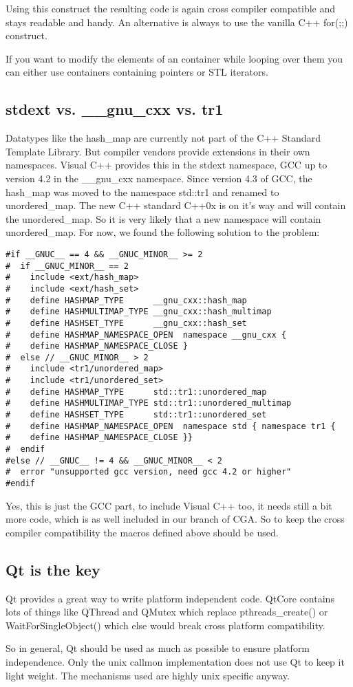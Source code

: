 Using this construct the resulting code is again cross compiler compatible and stays readable and handy. An alternative is always to use the vanilla C++ for(;;) construct. 

If you want to modify the elements of an container while looping over them you can either use containers containing pointers or STL iterators.

\subsection{stdext vs. \_\_gnu\_cxx vs. tr1} Datatypes like the hash\_map are currently not part of the C++ Standard Template Library. But compiler vendors provide extensions in their own namespaces. Visual C++ provides this in the stdext namespace, GCC up to version 4.2 in the \_\_gnu\_cxx namespace. Since version 4.3 of GCC, the hash\_map was moved to the namespace std::tr1 and renamed to unordered\_map. The new C++ standard C++0x is on it's way and will contain the unordered\_map. So it is very likely that a new namespace will contain unordered\_map. For now, we found the following solution to the problem:

\begin{verbatim}
#if __GNUC__ == 4 && __GNUC_MINOR__ >= 2
#  if __GNUC_MINOR__ == 2
#    include <ext/hash_map>
#    include <ext/hash_set>
#    define HASHMAP_TYPE      __gnu_cxx::hash_map
#    define HASHMULTIMAP_TYPE __gnu_cxx::hash_multimap
#    define HASHSET_TYPE      __gnu_cxx::hash_set
#    define HASHMAP_NAMESPACE_OPEN  namespace __gnu_cxx {
#    define HASHMAP_NAMESPACE_CLOSE }
#  else // __GNUC_MINOR__ > 2
#    include <tr1/unordered_map>
#    include <tr1/unordered_set>
#    define HASHMAP_TYPE      std::tr1::unordered_map
#    define HASHMULTIMAP_TYPE std::tr1::unordered_multimap
#    define HASHSET_TYPE      std::tr1::unordered_set
#    define HASHMAP_NAMESPACE_OPEN  namespace std { namespace tr1 {
#    define HASHMAP_NAMESPACE_CLOSE }}
#  endif
#else // __GNUC__ != 4 && __GNUC_MINOR__ < 2
#  error "unsupported gcc version, need gcc 4.2 or higher"
#endif
\end{verbatim}

Yes, this is just the GCC part, to include Visual C++ too, it needs still a bit more code, which is as well included in our branch of CGA. So to keep the cross compiler compatibility the macros defined above should be used. 

\subsection{Qt is the key}

Qt provides a great way to write platform independent code. QtCore contains lots of things like QThread and QMutex which replace pthreads\_create() or WaitForSingleObject() which else would break cross platform compatibility.

So in general, Qt should be used as much as possible to ensure platform independence. Only the unix callmon implementation does not use Qt to keep it light weight. The mechanisms used are highly unix specific anyway. 
